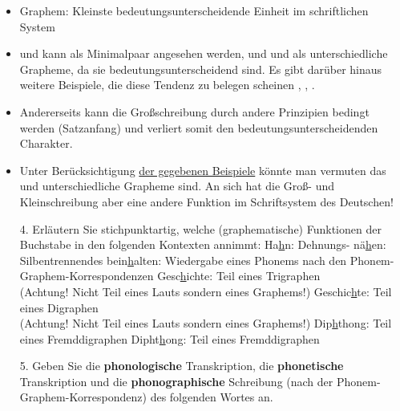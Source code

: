 {\begin{frame}[allowframebreaks]
\begin{itemize}
				\item Graphem: Kleinste bedeutungsunterscheidende Einheit im schriftlichen System
				\item {} und  kann als Minimalpaar angesehen werden, und  und  als unterschiedliche Grapheme, da sie bedeutungsunterscheidend sind. Es gibt darüber hinaus weitere Beispiele, die diese Tendenz zu belegen scheinen  \vs {},  \vs {},  \vs {}.
				\item Andererseits kann die Großschreibung durch andere Prinzipien bedingt werden (\zB Satzanfang) und verliert somit den bedeutungsunterscheidenden Charakter.
				\item Unter Berücksichtigung \underline{der gegebenen Beispiele} könnte man vermuten das  und  unterschiedliche Grapheme sind. An sich hat die Groß- und Kleinschreibung aber eine andere Funktion im Schriftsystem des Deutschen!
		\end{itemize}
	\end{frame}
	
	\begin{frame}
		\begin{itemize}
			\item[4.] Erläutern Sie stichpunktartig, welche (graphematische) Funktionen der Buchstabe  in den folgenden Kontexten annimmt:
			\eal
			\ex Ha\underline{h}n: Dehnungs-
			\bigskip
			\ex nä\underline{h}en: Silbentrennendes 
			\bigskip
			\ex bein\underline{h}alten: Wiedergabe eines Phonems \textipa{[h]} nach den Phonem-Graphem-Korrespondenzen
			\bigskip
			\ex Gesc\underline{h}ichte: Teil eines Trigraphen \\(Achtung! Nicht Teil eines Lauts sondern eines Graphems!)
			\bigskip
			\ex Geschic\underline{h}te: Teil eines Digraphen \\(Achtung! Nicht Teil eines Lauts sondern eines Graphems!)
			\bigskip
			\ex Dip\underline{h}thong: Teil eines Fremddigraphen 
			\bigskip
			\ex Dipht\underline{h}ong: Teil eines Fremddigraphen 
			\zl
		\end{itemize}
	\end{frame}
	
	\begin{frame}
		\begin{itemize}
			\item[5.] Geben Sie die \textbf{phonologische} Transkription, die \textbf{phonetische} Transkription und die \textbf{phonographische} Schreibung (nach der Phonem-Graphem-Korrespondenz) des folgenden Wortes an.
			

\end{itemize}
\end{frame}}
